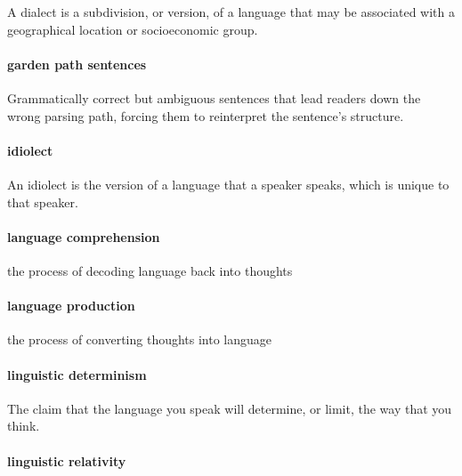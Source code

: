 \documentclass[
]{krantz}
\begin{document}
A dialect is a subdivision, or version, of a language that may be associated with a geographical location or socioeconomic group.

\paragraph*{garden path sentences}\label{garden-path-sentences}

Grammatically correct but ambiguous sentences that lead readers down the wrong parsing path, forcing them to reinterpret the sentence's structure.

\paragraph*{idiolect}\label{idiolect}

An idiolect is the version of a language that a speaker speaks, which is unique to that speaker.

\paragraph*{language comprehension}\label{language-comprehension}

the process of decoding language back into thoughts

\paragraph*{language production}\label{langproddef}

the process of converting thoughts into language

\paragraph*{linguistic determinism}\label{linguistic-determinism}

The claim that the language you speak will determine, or limit, the way that you think.

\paragraph*{linguistic relativity}\label{linguistic-relativity}
\end{document}
